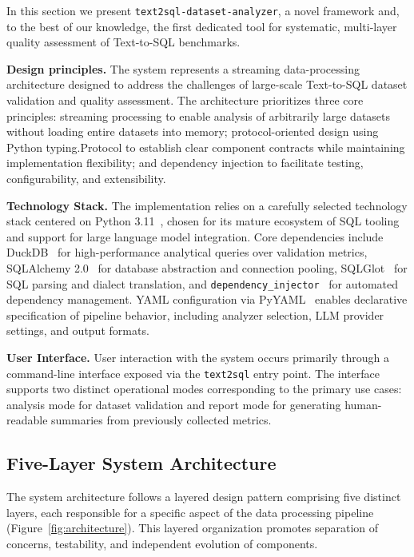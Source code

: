\documentclass[]{einformatica}
\begin{document}
In this section we present \texttt{text2sql-dataset-analyzer}, a novel framework and, to the best of our knowledge, the first dedicated tool for systematic, multi-layer quality assessment of Text-to-SQL benchmarks.

\textbf{Design principles.} The system represents a streaming data-processing architecture designed to address the challenges of large-scale Text-to-SQL dataset validation and quality assessment. The architecture prioritizes three core principles: streaming processing to enable analysis of arbitrarily large datasets without loading entire datasets into memory; protocol-oriented design using Python typing.Protocol to establish clear component contracts while maintaining implementation flexibility; and dependency injection to facilitate testing, configurability, and extensibility.

\textbf{Technology Stack.} The implementation relies on a carefully selected technology stack centered on Python 3.11~\cite{python311}, chosen for its mature ecosystem of SQL tooling and support for large language model integration. Core dependencies include DuckDB~\cite{duckdb} for high-performance analytical queries over validation metrics, SQLAlchemy 2.0~\cite{sqlalchemy} for database abstraction and connection pooling, SQLGlot~\cite{sqlglot} for SQL parsing and dialect translation, and \texttt{dependency\_injector}~\cite{dependency_injector} for automated dependency management. YAML configuration via PyYAML~\cite{pyyaml} enables declarative specification of pipeline behavior, including analyzer selection, LLM provider settings, and output formats.

\textbf{User Interface.} User interaction with the system occurs primarily through a command-line interface exposed via the \texttt{text2sql} entry point. The interface supports two distinct operational modes corresponding to the primary use cases: analysis mode for dataset validation and report mode for generating human-readable summaries from previously collected metrics.

\subsection{Five-Layer System Architecture}

The system architecture follows a layered design pattern comprising five distinct layers, each responsible for a specific aspect of the data processing pipeline (Figure~\ref{fig:architecture}). This layered organization promotes separation of concerns, testability, and independent evolution of components.
\end{document}
